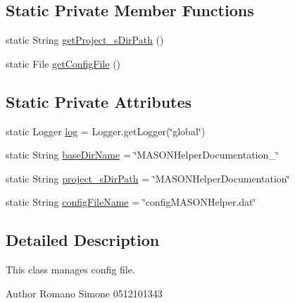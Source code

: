 \subsection*{Static Private Member Functions}
\begin{DoxyCompactItemize}
\item 
static String \hyperlink{classit_1_1isislab_1_1masonhelperdocumentation_1_1mason_1_1control_1_1_config_file_aa6b3af1b13073f9fb4a6516dfa54310b}{get\-Project\-\_\-s\-Dir\-Path} ()
\item 
static File \hyperlink{classit_1_1isislab_1_1masonhelperdocumentation_1_1mason_1_1control_1_1_config_file_ac533dd01e862be359ae060d278daf1ea}{get\-Config\-File} ()
\end{DoxyCompactItemize}
\subsection*{Static Private Attributes}
\begin{DoxyCompactItemize}
\item 
static Logger \hyperlink{classit_1_1isislab_1_1masonhelperdocumentation_1_1mason_1_1control_1_1_config_file_a1e0cc7c39d846dcf3dd9def42f836e89}{log} = Logger.\-get\-Logger(\char`\"{}global\char`\"{})
\item 
static String \hyperlink{classit_1_1isislab_1_1masonhelperdocumentation_1_1mason_1_1control_1_1_config_file_ab6c578c3ded7f434d692230f7a4d2e81}{base\-Dir\-Name} = \char`\"{}M\-A\-S\-O\-N\-Helper\-Documentation\-\_\-\char`\"{}
\item 
static String \hyperlink{classit_1_1isislab_1_1masonhelperdocumentation_1_1mason_1_1control_1_1_config_file_a693307679d18c1e5bc8830e878d12e9d}{project\-\_\-s\-Dir\-Path} = \char`\"{}M\-A\-S\-O\-N\-Helper\-Documentation\char`\"{}
\item 
static String \hyperlink{classit_1_1isislab_1_1masonhelperdocumentation_1_1mason_1_1control_1_1_config_file_a46a4e9d3359f002ff462e19976987878}{config\-File\-Name} = \char`\"{}config\-M\-A\-S\-O\-N\-Helper.\-dat\char`\"{}
\end{DoxyCompactItemize}


\subsection{Detailed Description}
This class manages config file.

\begin{DoxyAuthor}{Author}
Romano Simone 0512101343 
\end{DoxyAuthor}


